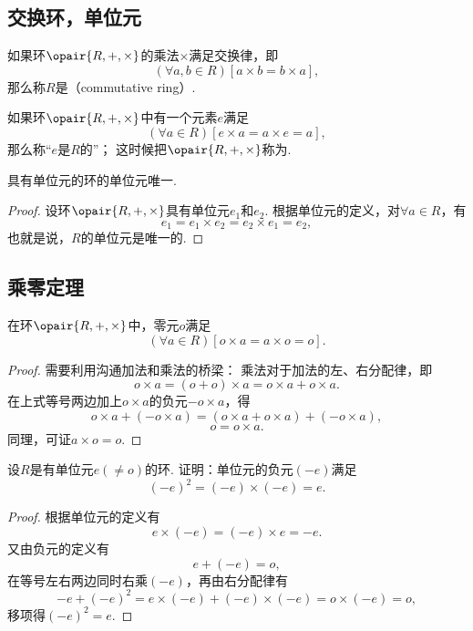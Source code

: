 \subsection{交换环，单位元}
\begin{definition}
如果环\(\opair{R,+,\times}\)的乘法\(\times\)满足交换律，即\[
	(\forall a,b \in R)[a \times b = b \times a],
\]
那么称\(R\)是（commutative ring）.
\end{definition}

\begin{definition}
如果环\(\opair{R,+,\times}\)中有一个元素\(e\)满足\[
	(\forall a \in R)[e \times a = a \times e = a],
\]
那么称“\(e\)是\(R\)的”；
这时候把\(\opair{R,+,\times}\)称为.
\end{definition}

\begin{property}
具有单位元的环的单位元唯一.
\begin{proof}
设环\(\opair{R,+,\times}\)具有单位元\(e_1\)和\(e_2\).
根据单位元的定义，对\(\forall a \in R\)，有\[
    e_1 = e_1 \times e_2 = e_2 \times e_1 = e_2,
\]
也就是说，\(R\)的单位元是唯一的.
\end{proof}
\end{property}

\subsection{乘零定理}
\begin{theorem}[乘零定理]
在环\(\opair{R,+,\times}\)中，零元\(o\)满足\[
    (\forall a \in R)[o \times a = a \times o = o].
\]
\begin{proof}
需要利用沟通加法和乘法的桥梁：
乘法对于加法的左、右分配律，即\[
    o \times a = (o + o) \times a = o \times a + o \times a.
\]在上式等号两边加上\(o \times a\)的负元\(-o \times a\)，得\[
    o \times a + (- o \times a) = (o \times a + o \times a) + (- o \times a),
\]\[
    o = o \times a.
\]
同理，可证\(a \times o = o\).
\end{proof}
\end{theorem}

\begin{example}
设\(R\)是有单位元\(e(\neq o)\)的环.
证明：单位元的负元\((-e)\)满足\[
    (-e)^2=(-e)\times(-e)=e.
\]
\begin{proof}
根据单位元的定义有\[
    e \times (-e) = (-e) \times e = -e.
\]
又由负元的定义有\[
    e + (-e) = o,
\]
在等号左右两边同时右乘\((-e)\)，再由右分配律有\[
    -e + (-e)^2 = e \times (-e) + (-e) \times (-e) = o \times (-e) = o,
\]
移项得\((-e)^2 = e\).
\end{proof}
\end{example}

